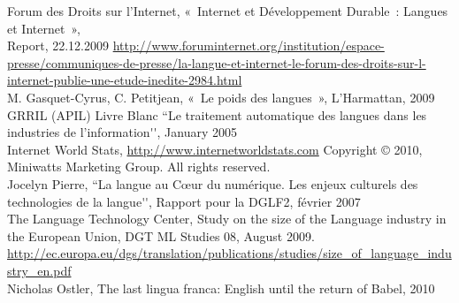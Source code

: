 Forum des Droits sur l’Internet, «~Internet et Développement Durable~: Langues et Internet~»,\\
Report, 22.12.2009 \url{http://www.foruminternet.org/institution/espace-presse/communiques-de-presse/la-langue-et-internet-le-forum-des-droits-sur-l-internet-publie-une-etude-inedite-2984.html}\\


M. Gasquet-Cyrus, C. Petitjean, «~Le poids des langues~», L’Harmattan, 2009\\

GRRIL (APIL) Livre Blanc ``Le traitement automatique des langues dans les industries de l’information{\mbox '}{\mbox '}, January 2005\\

Internet World Stats, \url{http://www.internetworldstats.com} Copyright © 2010, Miniwatts Marketing Group. All rights reserved.\\

Jocelyn Pierre, ``La langue au Cœur du numérique. Les enjeux culturels des technologies de la langue{\mbox '}{\mbox '}, Rapport pour la DGLF2, février 2007\\

The Language Technology Center, Study on the size of the Language industry in the European Union, DGT ML Studies 08, August 2009. \url{http://ec.europa.eu/dgs/translation/publications/studies/size\_of\_language\_industry\_en.pdf}\\

Nicholas Ostler, The last lingua franca: English until the return of Babel, 2010\\



%

  
\cleardoublepage

\label{metanetmembers}

